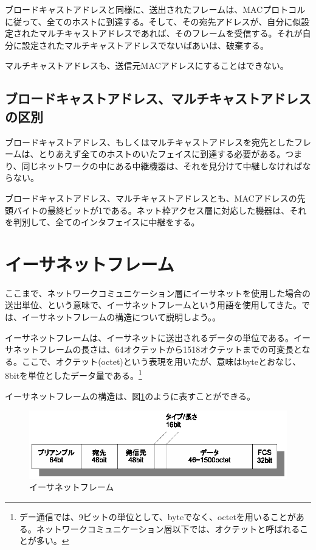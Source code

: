 ブロードキャストアドレスと同様に、送出されたフレームは、MACプロトコルに従って、全てのホストに到達する。そして、その宛先アドレスが、自分に似設定されたマルチキャストアドレスであれば、そのフレームを受信する。それが自分に設定されたマルチキャストアドレスでないばあいは、破棄する。

マルチキャストアドレスも、送信元MACアドレスにすることはできない。

\subsection{ブロードキャストアドレス、マルチキャストアドレスの区別}
ブロードキャストアドレス、もしくはマルチキャストアドレスを宛先としたフレームは、とりあえず全てのホストのいたフェイスに到達する必要がある。つまり、同じネットワークの中にある中継機器は、それを見分けて中継しなければならない。

ブロードキャストアドレス、マルチキャストアドレスとも、MACアドレスの先頭バイトの最終ビットが1である。ネット枠アクセス層に対応した機器は、それを判別して、全てのインタフェイスに中継をする。

\section{イーサネットフレーム}

ここまで、ネットワークコミュニケーション層にイーサネットを使用した場合の送出単位、という意味で、イーサネットフレームという用語を使用してきた。では、イーサネットフレームの構造について説明しよう。。

イーサネットフレームは、イーサネットに送出されるデータの単位である。イーサネットフレームの長さは、64オクテットから1518オクテットまでの可変長となる。ここで、オクテット(octet)という表現を用いたが、意味はbyteとおなじ、8bitを単位としたデータ量である。\footnote{デー通信では、9ビットの単位として、byteでなく、octetを用いることがある。ネットワークコミュニケーション層以下では、オクテットと呼ばれることが多い。}

イーサネットフレームの構造は、図\ref{fig:etherframe}のように表すことができる。

\begin{figure}[htbp]
	\includegraphics[width=14cm,clip]{draw/ethernetframe.eps}
	\caption{イーサネットフレーム}
	\label{fig:etherframe}
\end{figure}


